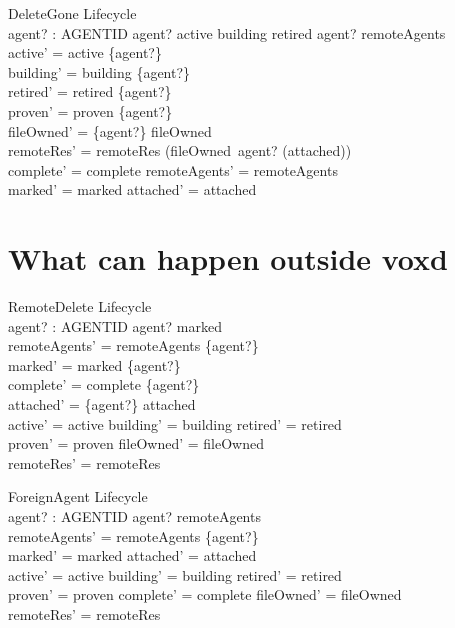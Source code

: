 \documentclass[a4paper,10pt,fleqn]{article}
\begin{document}
\begin{schema}{DeleteGone}
  \Delta Lifecycle \\
  agent? : AGENTID
\where
  agent? \in active \cup building \cup retired \land agent? \notin remoteAgents \\
  active' = active \setminus \{agent?\} \\
  building' = building \setminus \{agent?\} \\
  retired' = retired \setminus \{agent?\} \\
  proven' = proven \setminus \{agent?\} \\
  fileOwned' = \{agent?\} \ndres fileOwned \\
  remoteRes' = remoteRes \setminus
    (fileOwned~agent? \setminus \bigcup (\ran attached)) \\
  complete' = complete \land remoteAgents' = remoteAgents \\
  marked' = marked \land attached' = attached
\end{schema}

\section{What can happen outside voxd}

\begin{schema}{RemoteDelete}
  \Delta Lifecycle \\
  agent? : AGENTID
\where
  agent? \in marked \\
  remoteAgents' = remoteAgents \setminus \{agent?\} \\
  marked' = marked \setminus \{agent?\} \\
  complete' = complete \setminus \{agent?\} \\
  attached' = \{agent?\} \ndres attached \\
  active' = active \land building' = building \land retired' = retired \\
  proven' = proven \land fileOwned' = fileOwned \\
  remoteRes' = remoteRes
\end{schema}

\begin{schema}{ForeignAgent}
  \Delta Lifecycle \\
  agent? : AGENTID
\where
  agent? \notin remoteAgents \\
  remoteAgents' = remoteAgents \cup \{agent?\} \\
  marked' = marked \land attached' = attached \\
  active' = active \land building' = building \land retired' = retired \\
  proven' = proven \land complete' = complete \land fileOwned' = fileOwned \\
  remoteRes' = remoteRes
\end{schema}
\end{document}

